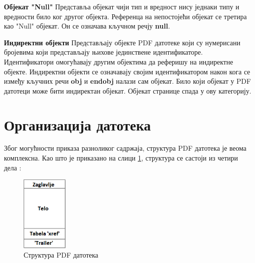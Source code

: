 \documentclass[12pt,oneside]{memoir}
\begin{document}
\begin{description}
\item \textbf{Објекат "Null"} Представља објекат чији тип и вредност нису једнаки типу и вредности било ког другог објекта. Референца на непостојећи објекат се третира као "Null" објекат. Он се означава кључном речју \textbf{null}.
\item \textbf{Индиректни објекти} Представљају објекте PDF датотеке који су нумерисани бројевима који представљају њихове јединствене идентификаторе. Идентификатори омогућавају другим објектима да реферишу на индиректне објекте. Индиректни објекти се означавају својим идентификатором након кога се између кључних речи \textbf{obj} и \textbf{endobj} налази сам објекат. Било који објекат у PDF датотеци може бити индиректан објекат. Објекат странице спада у ову категорију.
\end{description} 

\section{Организација датотека}
\label{sec:organizacijaDatotekaPDF}

Због могућности приказа разноликог садржаја, структура PDF датотека је веома комплексна. Као што је приказано на слици \ref{fig:pdfStruktura1}, структура се састоји из четири дела \cite{PDFDoc, introToPdf, basicStrPdf}:

\begin{figure}[!ht]
\centering
\includegraphics[width=0.2\textwidth]{pdfStruktura1.png}
\caption{Структура PDF датотека}
\label{fig:pdfStruktura1}
\end{figure}
\end{document}
